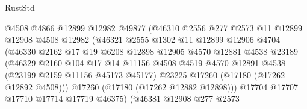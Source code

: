 \begin{lexlean}{RustStd}
\begin{coremodule}
                                @4508
                                @4866
                                @12899
                                @12982
                                @49877
                                (@46310
                                  @2556
                                  @277
                                  @2573
                                  @11
                                  @12899
                                  @12908
                                  @4508
                                  @12982
                                  (@46321
                                    @2555
                                    @1302
                                    @11
                                    @12899
                                    @12906
                                    @4704
                                    (@46330
                                      @2162
                                      @17
                                      @19
                                      @6208
                                      @12898
                                      @12905
                                      @4570
                                      @12881
                                      @4538
                                      @23189
                                      (@46329
                                        @2160
                                        @104
                                        @17
                                        @14
                                        @11156
                                        @4508
                                        @4519
                                        @4570
                                        @12891
                                        @4538
                                        (@23199 @2159 @11156 @45173 @45177)
                                        @23225
                                        @17260
                                        (@17180 (@17262 @12892 @4508)))
                                      @17260
                                      (@17180 (@17262 @12882 @12898)))
                                    @17704
                                    @17707
                                    @17710
                                    @17714
                                    @17719
                                    @46375)
                                  (@46381
                                    @12908
                                    @277
                                    @2573

\end{coremodule}
\end{lexlean}
